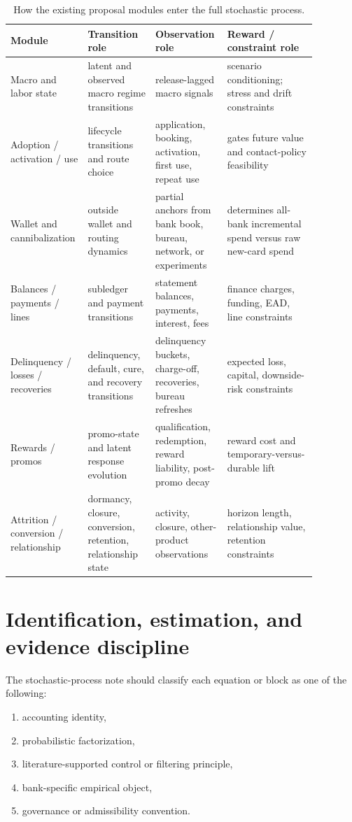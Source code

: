 \documentclass[11pt]{article}
\newcommand{\1}{\mathbf{1}}
\theoremstyle{definition}
\begin{document}
\begin{table}[t]
\centering
\caption{How the existing proposal modules enter the full stochastic process.}
\label{tab:module-map}
\begin{tabular}{L{0.18\linewidth}L{0.21\linewidth}L{0.20\linewidth}L{0.28\linewidth}}
\toprule
Module & Transition role & Observation role & Reward / constraint role \\
\midrule
Macro and labor state
  & latent and observed macro regime transitions
  & release-lagged macro signals
  & scenario conditioning; stress and drift constraints \\
Adoption / activation / use
  & lifecycle transitions and route choice
  & application, booking, activation, first use, repeat use
  & gates future value and contact-policy feasibility \\
Wallet and cannibalization
  & outside wallet and routing dynamics
  & partial anchors from bank book, bureau, network, or experiments
  & determines all-bank incremental spend versus raw new-card spend \\
Balances / payments / lines
  & subledger and payment transitions
  & statement balances, payments, interest, fees
  & finance charges, funding, EAD, line constraints \\
Delinquency / losses / recoveries
  & delinquency, default, cure, and recovery transitions
  & delinquency buckets, charge-off, recoveries, bureau refreshes
  & expected loss, capital, downside-risk constraints \\
Rewards / promos
  & promo-state and latent response evolution
  & qualification, redemption, reward liability, post-promo decay
  & reward cost and temporary-versus-durable lift \\
Attrition / conversion / relationship
  & dormancy, closure, conversion, retention, relationship state
  & activity, closure, other-product observations
  & horizon length, relationship value, retention constraints \\
\bottomrule
\end{tabular}
\end{table}

\section{Identification, estimation, and evidence discipline}

The stochastic-process note should classify each equation or block as one of the
following:
\begin{enumerate}[label=\arabic*.]
  \item accounting identity,
  \item probabilistic factorization,
  \item literature-supported control or filtering principle,
  \item bank-specific empirical object,
  \item governance or admissibility convention.
\end{enumerate}
\end{document}
